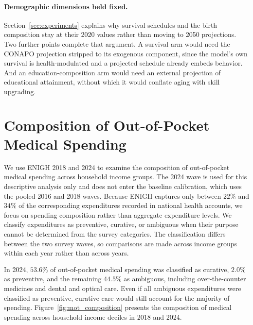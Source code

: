 \documentclass[12pt,a4paper]{article}
\begin{document}
\begin{appendices}
\paragraph{Demographic dimensions held fixed.} Section~\ref{sec:experiments} explains why survival schedules and the birth composition stay at their 2020 values rather than moving to 2050 projections. Two further points complete that argument. A survival arm would need the CONAPO projection stripped to its exogenous component, since the model's own survival is health-modulated and a projected schedule already embeds behavior. And an education-composition arm would need an external projection of educational attainment, without which it would conflate aging with skill upgrading.


\section{Composition of Out-of-Pocket Medical Spending}
\label{subsec:health_evidence}

We use ENIGH 2018 and 2024 to examine the composition of out-of-pocket medical spending across household income groups. The 2024 wave is used for this descriptive analysis only and does not enter the baseline calibration, which uses the pooled 2016 and 2018 waves. Because ENIGH captures only between $22\%$ and $34\%$ of the corresponding expenditures recorded in national health accounts, we focus on spending composition rather than aggregate expenditure levels. We classify expenditures as preventive, curative, or ambiguous when their purpose cannot be determined from the survey categories. The classification differs between the two survey waves, so comparisons are made across income groups within each year rather than across years.

In 2024, $53.6\%$ of out-of-pocket medical spending was classified as curative, $2.0\%$ as preventive, and the remaining $44.5\%$ as ambiguous, including over-the-counter medicines and dental and optical care. Even if all ambiguous expenditures were classified as preventive, curative care would still account for the majority of spending. Figure~\ref{fig:mot_composition} presents the composition of medical spending across household income deciles in 2018 and 2024.


\end{appendices}
\end{document}
